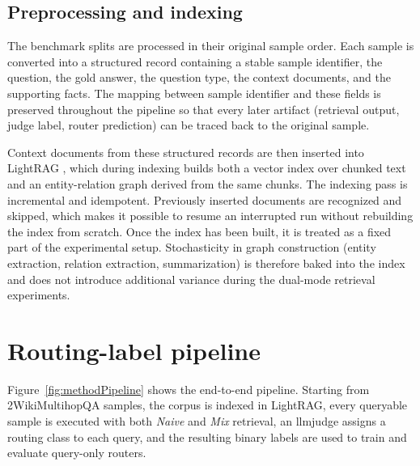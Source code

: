 \documentclass[english, bibtex]{kththesis}               %
\numberwithin{listing}{chapter}
\begin{document}
\subsection{Preprocessing and indexing}
\label{sec:methodPreprocessing}

The benchmark splits are processed in their original sample order. Each sample is converted into a structured record containing a stable sample identifier, the question, the gold answer, the question type, the context documents, and the supporting facts. The mapping between sample identifier and these fields is preserved throughout the pipeline so that every later artifact (retrieval output, judge label, router prediction) can be traced back to the original sample.

Context documents from these structured records are then inserted into LightRAG \cite{lightrag2024}, which during indexing builds both a vector index over chunked text and an entity-relation graph derived from the same chunks. The indexing pass is incremental and idempotent. Previously inserted documents are recognized and skipped, which makes it possible to resume an interrupted run without rebuilding the index from scratch. Once the index has been built, it is treated as a fixed part of the experimental setup. Stochasticity in graph construction (entity extraction, relation extraction, summarization) is therefore baked into the index and does not introduce additional variance during the dual-mode retrieval experiments.

\section{Routing-label pipeline}
\label{sec:methodPipeline}

Figure~\ref{fig:methodPipeline} shows the end-to-end pipeline. Starting from 2WikiMultihopQA samples, the corpus is indexed in LightRAG, every queryable sample is executed with both \emph{Naive} and \emph{Mix} retrieval, an \gls{llmjudge} assigns a routing class to each query, and the resulting binary labels are used to train and evaluate query-only routers.
\end{document}
